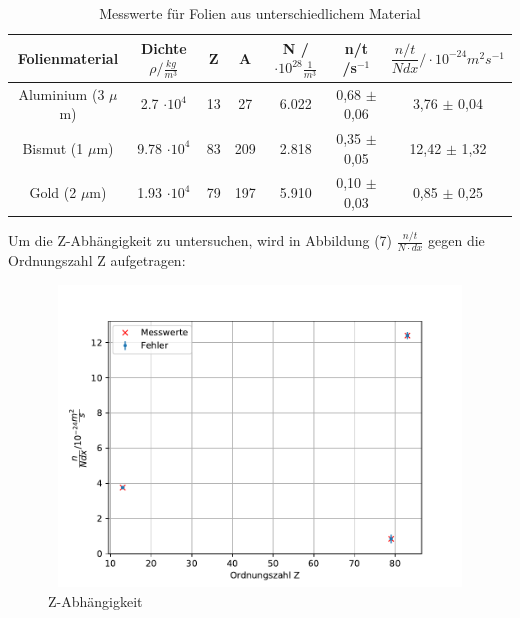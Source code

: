 \documentclass{article}
\begin{document}
\begin{table}[H] 
	\centering
	\begin{tabular}{c|c c c c c c }
		
		Folienmaterial &Dichte $\rho / \frac{kg}{m^3}$& Z & A & N /$\cdot 10^{28} \frac{1}{m^3}$&  n/t /s$^{-1}$&$\dfrac{n/t}{Ndx} /\cdot10^{-24} m^2s^{-1}$ \\ 
		\hline 
		Aluminium (3 $\mu$m) &2.7 $\cdot 10^{4}$& 13 & 27& 6.022 & 0,68 $\pm$ 0,06 & 3,76 $\pm$ 0,04\\ 
		
		Bismut (1 $\mu$m)& 9.78 $\cdot 10^{4}$  & 83 & 209& 2.818 & 0,35 $\pm$ 0,05& 12,42 $\pm$ 1,32 \\ 
		
		Gold (2 $\mu$m) & 1.93   $\cdot 10^{4}$ & 79 & 197 & 5.910 &0,10 $\pm$ 0,03 & 0,85 $\pm$ 0,25  \\ 
		
	\end{tabular} 
	\caption{Messwerte für Folien aus unterschiedlichem Material} 
\end{table}
Um die Z-Abhängigkeit zu untersuchen, wird in Abbildung (7) $\frac{n/t}{N\cdot dx}$ gegen die Ordnungszahl Z aufgetragen: 
	\begin{figure}[H]
	
	\centering
	\includegraphics[height=8cm,width=12cm]{kernzahl.pdf}
	\caption{ Z-Abhängigkeit}
	\label{fig: abb. 1}
	
	
\end{figure} 
\end{document}
